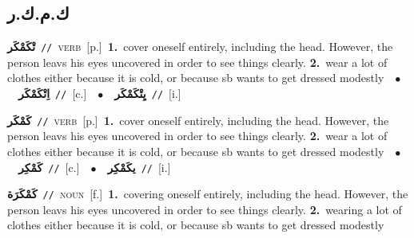 \documentclass[10pt,a4paper,twoside]{article} %
\begin{document}
\begin{multicols}{2}
\vspace{-3mm}
\subsection*{\color{blue}\foreignlanguage{arabic}{ك.م.ك.ر}\color{blue}{}} 

{\setlength\topsep{0pt}\textbf{\foreignlanguage{arabic}{تْكَمْكَر}}\ {\color{gray}\texttt{//}\color{black}}\ \textsc{verb}\ [p.]\ \textbf{1.}~cover oneself entirely, including the head. However, the person leavs his eyes uncovered in order to see things clearly.  \textbf{2.}~wear a lot of clothes either because it is cold, or because sb wants to get dressed modestly\ \ $\bullet$\ \ \setlength\topsep{0pt}\textbf{\foreignlanguage{arabic}{اِتْكَمْكَر}}\ {\color{gray}\texttt{//}\color{black}}\ [c.]\ \ $\bullet$\ \ \setlength\topsep{0pt}\textbf{\foreignlanguage{arabic}{يِتْكَمْكَر}}\ {\color{gray}\texttt{//}\color{black}}\ [i.]\ } \vspace{2mm}

{\setlength\topsep{0pt}\textbf{\foreignlanguage{arabic}{كَمْكَر}}\ {\color{gray}\texttt{//}\color{black}}\ \textsc{verb}\ [p.]\ \textbf{1.}~cover oneself entirely, including the head. However, the person leavs his eyes uncovered in order to see things clearly.  \textbf{2.}~wear a lot of clothes either because it is cold, or because sb wants to get dressed modestly\ \ $\bullet$\ \ \setlength\topsep{0pt}\textbf{\foreignlanguage{arabic}{كَمْكِر}}\ {\color{gray}\texttt{//}\color{black}}\ [c.]\ \ $\bullet$\ \ \setlength\topsep{0pt}\textbf{\foreignlanguage{arabic}{يكَمْكِر}}\ {\color{gray}\texttt{//}\color{black}}\ [i.]\ } \vspace{2mm}

{\setlength\topsep{0pt}\textbf{\foreignlanguage{arabic}{كَمْكَرَة}}\ {\color{gray}\texttt{//}\color{black}}\ \textsc{noun}\ [f.]\ \textbf{1.}~covering oneself entirely, including the head. However, the person leavs his eyes uncovered in order to see things clearly.  \textbf{2.}~wearing a lot of clothes either because it is cold, or because sb wants to get dressed modestly\ } \vspace{2mm}


\end{multicols}
\end{document}
